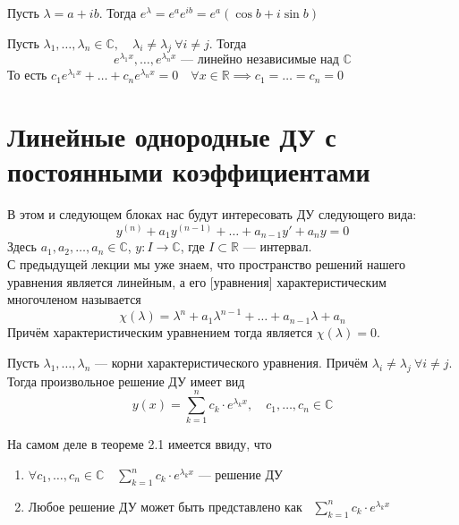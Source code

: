 \documentclass[11pt]{article}
\begin{document}
\begin{definition}
  Пусть $\lambda = a + ib$. Тогда $e^\lambda = e^ae^{ib} = e^a(\cos b + i\sin b)$
\end{definition}

\begin{statement}
  Пусть $\lambda_1, \ldots, \lambda_n \in \mathbb{C}, \quad \lambda_i \neq \lambda_j \ \forall i \neq j$. Тогда 
  \[e^{\lambda_1x}, \ldots, e^{\lambda_nx} \text{ --- линейно независимые над } \mathbb{C}\]
  То есть $c_1e^{\lambda_1x} + \ldots + c_ne^{\lambda_nx} = 0 \quad \forall x \in \mathbb{R} \implies c_1 = \ldots = c_n = 0$
\end{statement}

\section{Линейные однородные ДУ с постоянными коэффициентами}

В этом и следующем блоках нас будут интересовать ДУ следующего вида:
\[y^{(n)} + a_1 y^{(n - 1)} + \ldots + a_{n - 1} y' + a_n y = 0\]
Здесь $a_1, a_2, \ldots, a_n \in \mathbb{C}$, $y \colon I \to \mathbb{C}$, где $I \subset \mathbb{R}$ --- интервал. \\
С предыдущей лекции мы уже знаем, что пространство решений нашего уравнения является линейным, а его [уравнения] характеристическим многочленом называется 
\[\chi(\lambda) = \lambda^n + a_1 \lambda^{n - 1} + \ldots + a_{n - 1} \lambda + a_n\]
Причём характеристическим уравнением тогда является $\chi(\lambda) = 0$.

\begin{theorem}
  Пусть $\lambda_1, \ldots, \lambda_n$ --- корни характеристического уравнения. Причём $\lambda_i \neq \lambda_j \ \forall i \neq j$. 
  Тогда произвольное решение ДУ имеет вид 
  \[y(x) = \sum_{k = 1}^{n} c_k \cdot e^{\lambda_kx}, \quad c_1, \ldots, c_n \in \mathbb{C}\]
\end{theorem}

\begin{remark}
  На самом деле в теореме 2.1 имеется ввиду, что 
  \begin{enumerate}
    \item $\forall c_1, \ldots, c_n \in \mathbb{C} \quad \displaystyle \sum_{k = 1}^{n} c_k \cdot e^{\lambda_kx}$ --- решение ДУ
    \item Любое решение ДУ может быть представлено как \ $\displaystyle \sum_{k = 1}^{n} c_k \cdot e^{\lambda_kx}$
  \end{enumerate}
\end{remark}
\end{document}
